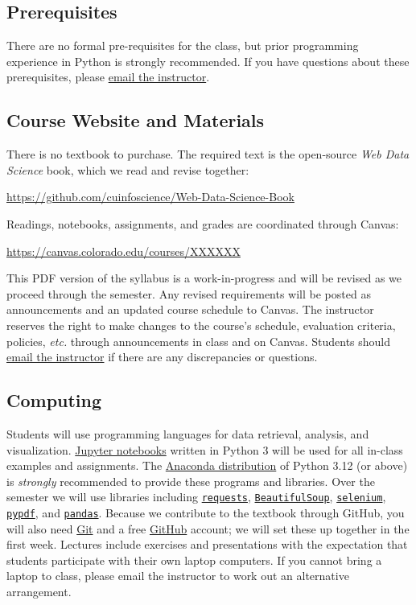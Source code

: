 \documentclass[11pt]{memoir}
\makeatletter
\def\canvasurl{https://canvas.colorado.edu/courses/XXXXXX}
\def\bookurl{https://github.com/cuinfoscience/Web-Data-Science-Book}
\def\instructoremail{brian.keegan@colorado.edu}
\makeatother
\begin{document}
\subsection{Prerequisites}
There are no formal pre-requisites for the class, but prior programming experience in Python is strongly recommended. If you have questions about these prerequisites, please \href{mailto:\instructoremail}{email the instructor}.

\subsection{Course Website and Materials}
There is no textbook to purchase. The required text is the open-source \textit{Web Data Science} book, which we read and revise together:
\vspace{-8pt}
    \begin{center}
    \Large{\href{\bookurl}{\bookurl}}
    \end{center}
\vspace{-8pt}
Readings, notebooks, assignments, and grades are coordinated through Canvas:
\vspace{-8pt}
    \begin{center}
    \large{\href{\canvasurl}{\canvasurl}}
    \end{center}
\vspace{-8pt}
This PDF version of the syllabus is a work-in-progress and will be revised as we proceed through the semester. Any revised requirements will be posted as announcements and an updated course schedule to Canvas. The instructor reserves the right to make changes to the course's schedule, evaluation criteria, policies, \textit{etc.} through announcements in class and on Canvas. Students should \href{mailto:\instructoremail}{email the instructor} if there are any discrepancies or questions.

\subsection{Computing}
Students will use programming languages for data retrieval, analysis, and visualization. \href{http://jupyter.org/}{Jupyter notebooks} written in Python 3 will be used for all in-class examples and assignments. The \href{https://www.anaconda.com/}{Anaconda distribution} of Python 3.12 (or above) is \textit{strongly} recommended to provide these programs and libraries. Over the semester we will use libraries including \href{https://requests.readthedocs.io/}{\texttt{requests}}, \href{https://www.crummy.com/software/BeautifulSoup/bs4/doc/}{\texttt{BeautifulSoup}}, \href{https://selenium-python.readthedocs.io/}{\texttt{selenium}}, \href{https://pypdf.readthedocs.io/}{\texttt{pypdf}}, and \href{https://pandas.pydata.org/}{\texttt{pandas}}. Because we contribute to the textbook through GitHub, you will also need \href{https://git-scm.com/}{Git} and a free \href{https://github.com/}{GitHub} account; we will set these up together in the first week. Lectures include exercises and presentations with the expectation that students participate with their own laptop computers. If you cannot bring a laptop to class, please email the instructor to work out an alternative arrangement.
\end{document}
